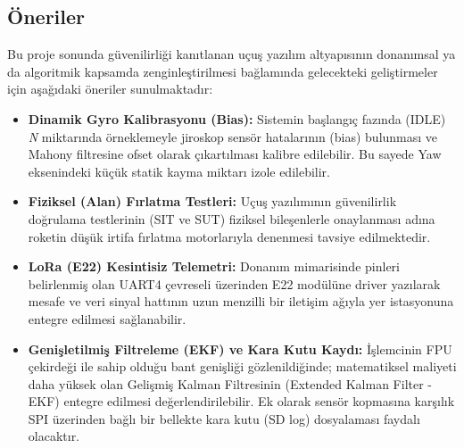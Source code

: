 \subsection{Öneriler}
\label{oneriler}

Bu proje sonunda güvenilirliği kanıtlanan uçuş yazılım altyapısının donanımsal ya da algoritmik kapsamda zenginleştirilmesi bağlamında gelecekteki geliştirmeler için aşağıdaki öneriler sunulmaktadır:
\begin{itemize}
    \item \textbf{Dinamik Gyro Kalibrasyonu (Bias):} Sistemin başlangıç fazında (IDLE) \textit{N} miktarında örneklemeyle jiroskop sensör hatalarının (bias) bulunması ve Mahony filtresine ofset olarak çıkartılması kalibre edilebilir. Bu sayede Yaw eksenindeki küçük statik kayma miktarı izole edilebilir.
    \item \textbf{Fiziksel (Alan) Fırlatma Testleri:} Uçuş yazılımının güvenilirlik doğrulama testlerinin (SIT ve SUT) fiziksel bileşenlerle onaylanması adına roketin düşük irtifa fırlatma motorlarıyla denenmesi tavsiye edilmektedir.
    \item \textbf{LoRa (E22) Kesintisiz Telemetri:} Donanım mimarisinde pinleri belirlenmiş olan UART4 çevreseli üzerinden E22 modülüne driver yazılarak mesafe ve veri sinyal hattının uzun menzilli bir iletişim ağıyla yer istasyonuna entegre edilmesi sağlanabilir.
    \item \textbf{Genişletilmiş Filtreleme (EKF) ve Kara Kutu Kaydı:} İşlemcinin FPU çekirdeği ile sahip olduğu bant genişliği gözlenildiğinde; matematiksel maliyeti daha yüksek olan Gelişmiş Kalman Filtresinin (Extended Kalman Filter - EKF) entegre edilmesi değerlendirilebilir. Ek olarak sensör kopmasına karşılık SPI üzerinden bağlı bir bellekte kara kutu (SD log) dosyalaması faydalı olacaktır.
\end{itemize}

\clearpage